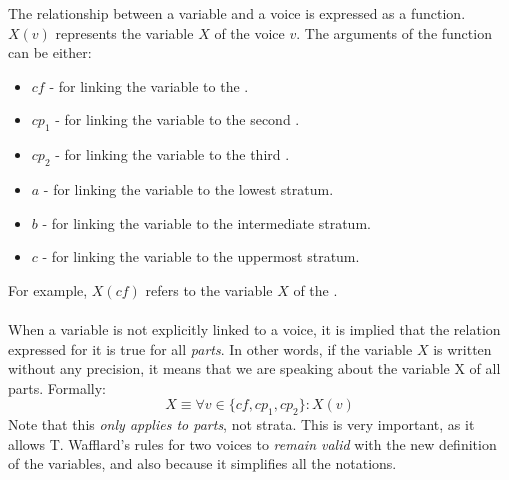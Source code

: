 The relationship between a variable and a voice is expressed as a function. $X(v)$ represents the variable $X$ of the voice $v$. The arguments of the function can be either:
\begin{itemize}
    \item $\mathit{cf}$ - for linking the variable to the \cf.
    \item $cp_1$ - for linking the variable to the second \cp.
    \item $cp_2$ - for linking the variable to the third \cp.
    \item $a$ - for linking the variable to the lowest stratum.
    \item $b$ - for linking the variable to the intermediate stratum.
    \item $c$ - for linking the variable to the uppermost stratum.
  \end{itemize}

\noindent For example, $X(\mathit{cf})$ refers to the variable $X$ of the \cf.

\paragraph{}
When a variable is not explicitly linked to a voice, it is implied that the relation expressed for it is true for all \textit{parts}. In other words, if the variable $X$ is written without any precision, it means that we are speaking about the variable X of all parts. Formally:
\begin{equation}
    X \equiv \forall v \in \{\mathit{cf}, cp_1, cp_2\}: X(v)    
\end{equation}
Note that this \textit{only applies to parts}, not strata.
This is very important, as it allows T. Wafflard's rules for two voices to \textit{remain valid} with the new definition of the variables, and also because it simplifies all the notations.

